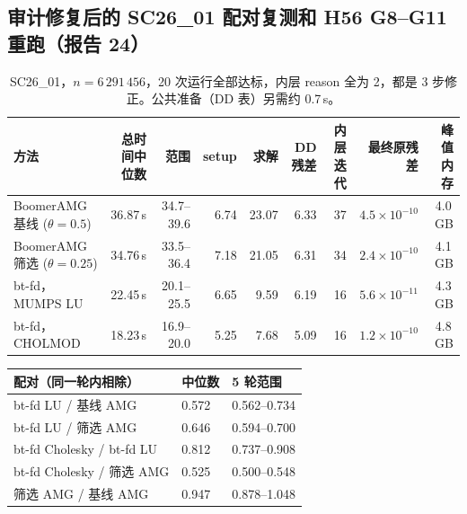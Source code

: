 \subsection{审计修复后的 SC26\_01 配对复测和 H56 G8--G11 重跑（报告 24）}
\begin{table}[H]
\centering\footnotesize\setlength{\tabcolsep}{4pt}
\begin{tabular}{lrrrrrrrr}
\toprule
方法 & 总时间中位数 & 范围 & setup & 求解 & DD 残差 & 内层迭代 & 最终原残差 & 峰值内存 \\
\midrule
BoomerAMG 基线 ($\theta=0.5$) & 36.87\,s & 34.7--39.6 & 6.74 & 23.07 & 6.33 & 37 & $4.5\times10^{-10}$ & 4.0\,GB \\
BoomerAMG 筛选 ($\theta=0.25$) & 34.76\,s & 33.5--36.4 & 7.18 & 21.05 & 6.31 & 34 & $2.4\times10^{-10}$ & 4.1\,GB \\
bt-fd，MUMPS LU & 22.45\,s & 20.1--25.5 & 6.65 & 9.59 & 6.19 & 16 & $5.6\times10^{-11}$ & 4.3\,GB \\
bt-fd，CHOLMOD & 18.23\,s & 16.9--20.0 & 5.25 & 7.68 & 5.09 & 16 & $1.2\times10^{-10}$ & 4.8\,GB \\
\bottomrule
\end{tabular}
\caption{SC26\_01，$n=6\,291\,456$，20 次运行全部达标，内层 reason 全为 2，都是 3 步修正。公共准备（DD 表）另需约 0.7\,s。}
\end{table}
\begin{table}[H]
\centering\small
\begin{tabular}{lll}
\toprule
配对（同一轮内相除） & 中位数 & 5 轮范围 \\
\midrule
bt-fd LU / 基线 AMG & 0.572 & 0.562--0.734 \\
bt-fd LU / 筛选 AMG & 0.646 & 0.594--0.700 \\
bt-fd Cholesky / bt-fd LU & 0.812 & 0.737--0.908 \\
bt-fd Cholesky / 筛选 AMG & 0.525 & 0.500--0.548 \\
筛选 AMG / 基线 AMG & 0.947 & 0.878--1.048 \\
\bottomrule
\end{tabular}
\end{table}
